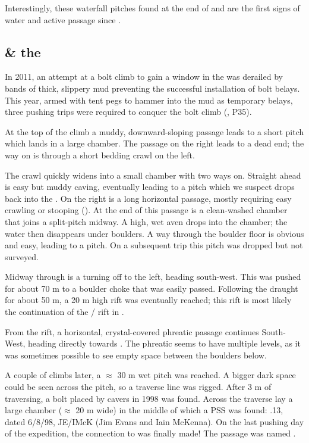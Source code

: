 Interestingly, these waterfall pitches found at the end of  and  are the first signs of water and active
passage since .


\subsection{ \& the }

In 2011, an attempt at a bolt climb to gain a window in the
 was derailed by bands of thick, slippery mud
preventing the successful installation of bolt belays. This year, armed
with tent pegs to hammer into the mud as temporary belays, three pushing
trips were required to conquer the bolt climb (, P35).

At the top of the climb a muddy, downward-sloping passage leads to a
short pitch which lands in a large chamber. The passage on the right
leads to a dead end; the way on is through a short bedding crawl on the
left.

The crawl quickly widens into a small chamber with two ways on. Straight
ahead is easy but muddy caving, eventually leading to a pitch which we
suspect drops back into the . On the right is a
long horizontal passage, mostly requiring easy crawling or stooping
(). At the end of this passage is a clean-washed chamber
that joins a split-pitch midway. A high, wet aven drops into the
chamber; the water then disappears under boulders. A way through the
boulder floor is obvious and easy, leading to a pitch. On a subsequent
trip this pitch was dropped but not surveyed.

Midway through  is a turning off to the left, heading
south-west. This was pushed for about 70 m to a boulder choke that was
easily passed. Following the draught for about 50 m, a 20 m high rift
was eventually reached; this rift is most likely the continuation of the
/ rift in .

From the rift, a horizontal, crystal-covered phreatic passage continues
South-West, heading directly towards . The phreatic seems
to have multiple levels, as it was sometimes possible to see empty space
between the boulders below.

A couple of climbs later, a $\approx$ 30 m wet pitch was reached.
A bigger dark space could be seen across the pitch, so a traverse line
was rigged. After 3 m of traversing, a bolt placed by cavers in 1998 was
found. Across the traverse lay a large chamber ($\approx$ 20 m
wide) in the middle of which a PSS was found: .13, dated
6/8/98, JE/IMcK (Jim Evans and Iain McKenna). On the last pushing day of the expedition, the
connection to  was finally made! The passage was named
.


